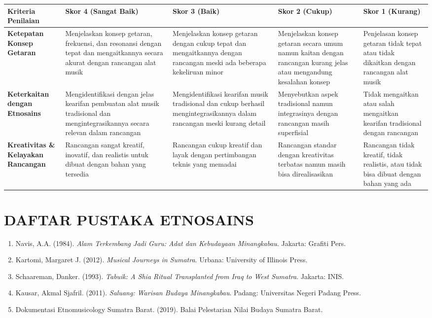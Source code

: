 \documentclass[12pt,a4paper]{article}
\begin{document}
\begin{longtable}{|p{3cm}|p{3cm}|p{3cm}|p{3cm}|p{3cm}|}
\hline
\textbf{Kriteria Penilaian} & \textbf{Skor 4 (Sangat Baik)} & \textbf{Skor 3 (Baik)} & \textbf{Skor 2 (Cukup)} & \textbf{Skor 1 (Kurang)} \\
\hline
\textbf{Ketepatan Konsep Getaran} & Menjelaskan konsep getaran, frekuensi, dan resonansi dengan tepat dan mengaitkannya secara akurat dengan rancangan alat musik & Menjelaskan konsep getaran dengan cukup tepat dan mengaitkannya dengan rancangan meski ada beberapa kekeliruan minor & Menjelaskan konsep getaran secara umum namun kaitan dengan rancangan kurang jelas atau mengandung kesalahan konsep & Penjelasan konsep getaran tidak tepat atau tidak dikaitkan dengan rancangan alat musik \\
\hline
\textbf{Keterkaitan dengan Etnosains} & Mengidentifikasi dengan jelas kearifan pembuatan alat musik tradisional dan mengintegrasikannya secara relevan dalam rancangan & Mengidentifikasi kearifan musik tradisional dan cukup berhasil mengintegrasikannya dalam rancangan meski kurang detail & Menyebutkan aspek tradisional namun integrasinya dengan rancangan masih superfisial & Tidak mengaitkan atau salah mengaitkan kearifan tradisional dengan rancangan \\
\hline
\textbf{Kreativitas \& Kelayakan Rancangan} & Rancangan sangat kreatif, inovatif, dan realistis untuk dibuat dengan bahan yang tersedia & Rancangan cukup kreatif dan layak dengan pertimbangan teknis yang memadai & Rancangan standar dengan kreativitas terbatas namun masih bisa direalisasikan & Rancangan tidak kreatif, tidak realistis, atau tidak bisa dibuat dengan bahan yang ada \\
\hline
\end{longtable}

\vspace{1cm}

\section{DAFTAR PUSTAKA ETNOSAINS}

\begin{enumerate}
\item Navis, A.A. (1984). \textit{Alam Terkembang Jadi Guru: Adat dan Kebudayaan Minangkabau}. Jakarta: Grafiti Pers.
\item Kartomi, Margaret J. (2012). \textit{Musical Journeys in Sumatra}. Urbana: University of Illinois Press.
\item Schaareman, Danker. (1993). \textit{Tabuik: A Shia Ritual Transplanted from Iraq to West Sumatra}. Jakarta: INIS.
\item Kausar, Akmal Sjafril. (2011). \textit{Saluang: Warisan Budaya Minangkabau}. Padang: Universitas Negeri Padang Press.
\item Dokumentasi Etnomusicology Sumatra Barat. (2019). Balai Pelestarian Nilai Budaya Sumatra Barat.
\end{enumerate}
\end{document}

